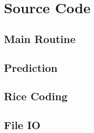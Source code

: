\documentclass{article}
\begin{document}
\newpage
\appendix
{}
\section*{Source Code} \label{App:code}
\subsection*{Main Routine}

\newpage
\subsection*{Prediction}


\newpage
\subsection*{Rice Coding}


\newpage
\subsection*{File IO}



\end{document}
